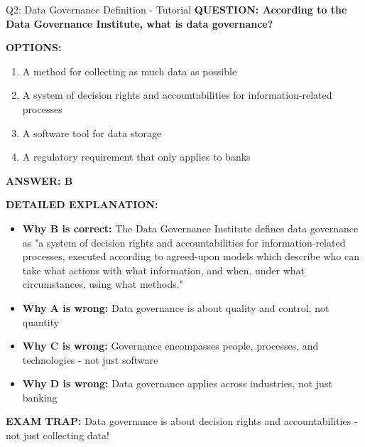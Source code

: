 \documentclass[8pt]{beamer}
\begin{document}
	\begin{frame}{Q2: Data Governance Definition - Tutorial}
		\fontsize{6.5}{7.5}\selectfont
		\textbf{QUESTION: According to the Data Governance Institute, what is data governance?}
		
		\vspace{0.1cm}
		\textbf{OPTIONS:}
		\begin{enumerate}
			\item A method for collecting as much data as possible
			\item A system of decision rights and accountabilities for information-related processes
			\item A software tool for data storage
			\item A regulatory requirement that only applies to banks
		\end{enumerate}
		
		\vspace{0.1cm}
		\textcolor{myblue}{\textbf{ANSWER: B}}
		
		\vspace{0.1cm}
		\textbf{DETAILED EXPLANATION:}
		\begin{itemize}
			\item \textbf{Why B is correct:} The Data Governance Institute defines data governance as "a system of decision rights and accountabilities for information-related processes, executed according to agreed-upon models which describe who can take what actions with what information, and when, under what circumstances, using what methods."
			\item \textbf{Why A is wrong:} Data governance is about quality and control, not quantity
			\item \textbf{Why C is wrong:} Governance encompasses people, processes, and technologies - not just software
			\item \textbf{Why D is wrong:} Data governance applies across industries, not just banking
		\end{itemize}
		
		\textcolor{myred}{\textbf{EXAM TRAP:}} Data governance is about \textcolor{myblue}{decision rights and accountabilities} - not just collecting data!
	\end{frame}
	
\end{document}
